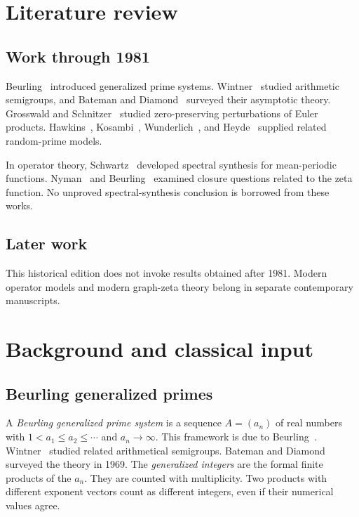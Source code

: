 \documentclass[12pt,letterpaper]{article}
\theoremstyle{definition}
\theoremstyle{remark}
\begin{document}
\section{Literature review}\label{sec:literature}
\subsection*{Work through 1981}
Beurling~\cite{Be37} introduced generalized prime systems.
Wintner~\cite{Wi44} studied arithmetic semigroups, and
Bateman and Diamond~\cite{BD69} surveyed their asymptotic theory.
Grosswald and Schnitzer~\cite{GS78} studied zero-preserving
perturbations of Euler products. Hawkins~\cite{Ha58},
Kosambi~\cite{Ko59}, Wunderlich~\cite{Wu74}, and
Heyde~\cite{He78} supplied related random-prime models.

In operator theory, Schwartz~\cite{Sc47} developed spectral
synthesis for mean-periodic functions. Nyman~\cite{Ny50}
and Beurling~\cite{Be55} examined closure questions related
to the zeta function. No unproved spectral-synthesis
conclusion is borrowed from these works.

\subsection*{Later work}
This historical edition does not invoke results obtained
after 1981. Modern operator models and modern graph-zeta
theory belong in separate contemporary manuscripts.

\section{Background and classical input}\label{sec:background}

\subsection{Beurling generalized primes}

A \emph{Beurling generalized prime system} is a sequence $A=(a_n)$ of real
numbers with $1<a_1\le a_2\le\cdots$ and $a_n\to\infty$. This framework is
due to Beurling~\cite{Be37}. Wintner~\cite{Wi44} studied related
arithmetical semigroups. Bateman and Diamond~\cite{BD69} surveyed the
theory in 1969. The \emph{generalized integers} are the formal finite products
of the $a_n$. They are counted with multiplicity. Two products with
different exponent vectors count as different integers, even if their
numerical values agree.
\end{document}
